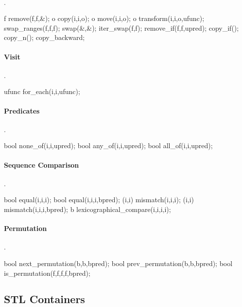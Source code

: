 \paragraph{}{.}
\begin{code}
f remove(f,f,&); o copy(i,i,o); o move(i,i,o);
o transform(i,i,o,ufunc);
swap_ranges(f,f,f); swap(&,&); iter_swap(f,f);
remove_if(f,f,upred); copy_if(); copy_n(); copy_backward;
\end{code}

\paragraph{Visit}{.}
\begin{code}
ufunc for_each(i,i,ufunc);
\end{code}

\paragraph{Predicates}{.}
\begin{code}
bool none_of(i,i,upred);
bool any_of(i,i,upred);
bool all_of(i,i,upred);
\end{code}

\paragraph{Sequence Comparison}{.}
\begin{code}
bool equal(i,i,i); bool equal(i,i,i,bpred);
(i,i) mismatch(i,i,i); (i,i) mismatch(i,i,i,bpred);
b lexicographical_compare(i,i,i,i);
\end{code}

\paragraph{Permutation}{.}
\begin{code}
bool next_permutation(b,b,bpred);
bool prev_permutation(b,b,bpred);
bool is_permutation(f,f,f,f,bpred);
\end{code}

\subsection*{STL Containers}
\begin{nametabler}
\end{nametabler}

